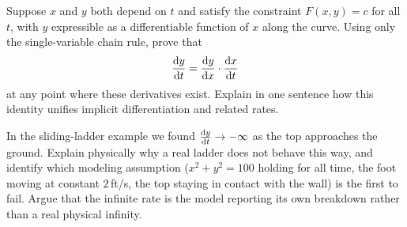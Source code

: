 \begin{exercise}[Proof]
Suppose $x$ and $y$ both depend on $t$ and satisfy the constraint $F(x,y)=c$ for all $t$, with $y$
expressible as a differentiable function of $x$ along the curve. Using only the single-variable chain
rule, prove that
\[
\frac{\mathrm{d} y}{\mathrm{d} t} = \frac{\mathrm{d} y}{\mathrm{d} x}\cdot\frac{\mathrm{d} x}{\mathrm{d} t}
\]
at any point where these derivatives exist. Explain in one sentence how this identity unifies
implicit differentiation and related rates.
\end{exercise}

\begin{exercise}[Conceptual]
In the sliding-ladder example we found $\frac{\mathrm{d} y}{\mathrm{d} t}\to -\infty$ as the top approaches the ground.
Explain physically why a real ladder does not behave this way, and identify which modeling assumption
($x^2 + y^2 = 100$ holding for all time, the foot moving at constant $2$\,ft/s, the top staying in
contact with the wall) is the first to fail. Argue that the infinite rate is the model
reporting its own breakdown rather than a real physical infinity.
\end{exercise}
